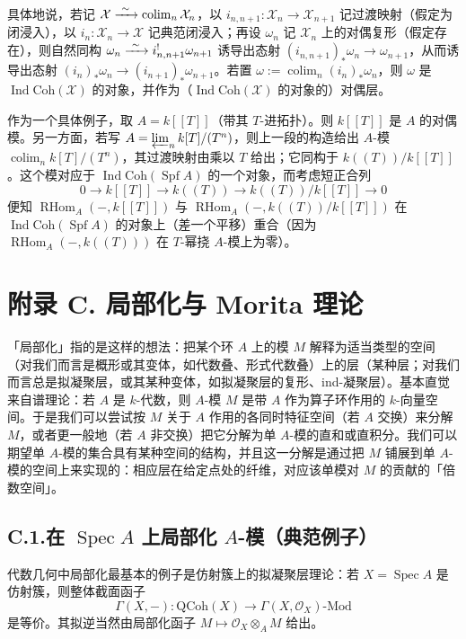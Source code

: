 具体地说，若记 $\mathcal X\xrightarrow{\ \sim\ }\operatorname*{colim}_n\mathcal X_n$，以 $i_{n,n+1}:\mathcal X_n\to\mathcal X_{n+1}$ 记过渡映射（假定为闭浸入），以 $i_n:\mathcal X_n\to\mathcal X$ 记典范闭浸入；再设 $\omega_n$ 记 $\mathcal X_n$ 上的对偶复形（假定存在），则自然同构 $\omega_n\xrightarrow{\ \sim\ } i^!_{n,n+1}\omega_{n+1}$ 诱导出态射 $(i_{n,n+1})_*\omega_n\to\omega_{n+1}$，从而诱导出态射 $(i_n)_*\omega_n\to(i_{n+1})_*\omega_{n+1}$。若置 $\omega:=\operatorname*{colim}_n(i_n)_*\omega_n$，则 $\omega$ 是 $\operatorname{Ind}\mathrm{Coh}(\mathcal X)$ 的对象，并作为（$\operatorname{Ind}\mathrm{Coh}(\mathcal X)$ 的对象的）对偶层。

作为一个具体例子，取 $A=k[[T]]$（带其 $T$-进拓扑）。则 $k[[T]]$ 是 $A$ 的对偶模。另一方面，若写 $A=\varprojlim_n k[T]/(T^n)$，则上一段的构造给出 $A$-模 $\operatorname*{colim}_n k[T]/(T^n)$，其过渡映射由乘以 $T$ 给出；它同构于 $k((T))/k[[T]]$。这个模对应于 $\operatorname{Ind}\mathrm{Coh}(\operatorname{Spf}A)$ 的一个对象，而考虑短正合列
\[
0\to k[[T]]\to k((T))\to k((T))/k[[T]]\to0
\]
便知 $\operatorname{RHom}_A(-,k[[T]])$ 与 $\operatorname{RHom}_A(-,k((T))/k[[T]])$ 在 $\operatorname{Ind}\mathrm{Coh}(\operatorname{Spf}A)$ 的对象上（差一个平移）重合（因为 $\operatorname{RHom}_A(-,k((T)))$ 在 $T$-幂挠 $A$-模上为零）。

\section*{附录 C. 局部化与 Morita 理论}

「局部化」指的是这样的想法：把某个环 $A$ 上的模 $M$ 解释为适当类型的空间（对我们而言是概形或其变体，如代数叠、形式代数叠）上的层（某种层；对我们而言总是拟凝聚层，或其某种变体，如拟凝聚层的复形、ind-凝聚层）。基本直觉来自谱理论：若 $A$ 是 $k$-代数，则 $A$-模 $M$ 是带 $A$ 作为算子环作用的 $k$-向量空间。于是我们可以尝试按 $M$ 关于 $A$ 作用的各同时特征空间（若 $A$ 交换）来分解 $M$，或者更一般地（若 $A$ 非交换）把它分解为单 $A$-模的直和或直积分。我们可以期望单 $A$-模的集合具有某种空间的结构，并且这一分解是通过把 $M$ 铺展到单 $A$-模的空间上来实现的：相应层在给定点处的纤维，对应该单模对 $M$ 的贡献的「倍数空间」。

\subsection*{C.1.\quad 在 $\operatorname{Spec}A$ 上局部化 $A$-模（典范例子）}
代数几何中局部化最基本的例子是仿射簇上的拟凝聚层理论：若 $X=\operatorname{Spec}A$ 是仿射簇，则整体截面函子
\begin{equation}\tag{C.1.1}\label{eq:a4-18-12}
\Gamma(X,-):\mathrm{QCoh}(X)\to\Gamma(X,\mathcal O_X)\text{-}\mathrm{Mod}
\end{equation}
是等价。其拟逆当然由局部化函子 $M\mapsto\mathcal O_X\otimes_A M$ 给出。

